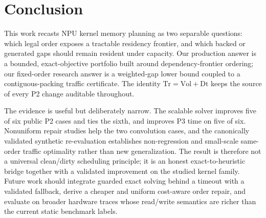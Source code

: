 \section{Conclusion}\label{sec:conclusion}

This work recasts NPU kernel memory planning as two separable questions: which
legal order exposes a tractable residency frontier, and which backed or
generated gaps should remain resident under capacity.  Our production answer is
a bounded, exact-objective portfolio built around dependency-frontier ordering;
our fixed-order research answer is a weighted-gap lower bound coupled to a
contiguous-packing traffic certificate.  The identity $\mathrm{Tr}=\mathrm{Vol}+\mathrm{Dt}$ keeps the source
of every P2 change auditable throughout.

The evidence is useful but deliberately narrow.  The scalable solver improves
five of six public P2 cases and ties the sixth, and improves P3 time on five of
six.  Nonuniform repair studies help the two convolution cases, and the
canonically validated synthetic re-evaluation establishes non-regression and
small-scale same-order traffic optimality rather than new generalization.  The result is therefore not a universal clean/dirty scheduling
principle; it is an honest exact-to-heuristic bridge together with a validated
improvement on the studied kernel family.  Future work should integrate guarded
exact solving behind a timeout with a validated fallback, derive a cheaper and
uniform cost-aware order repair, and evaluate on broader hardware traces whose
read/write semantics are richer than the current static benchmark labels.
